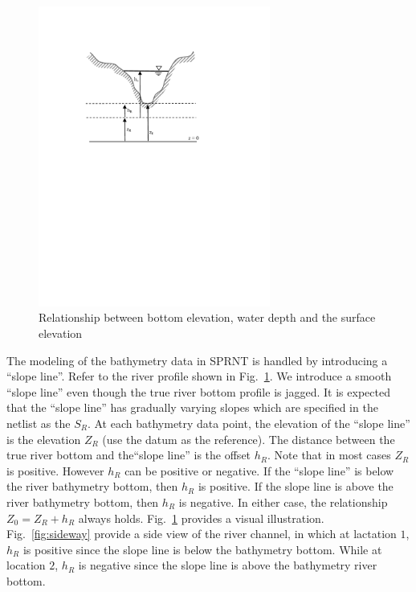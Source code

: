 \documentclass[10pt, letterpaper]{article}
\def\epswidth{3.0in}
\begin{document}
\begin{figure}[hbt]
\centerline{
\includegraphics[width=\epswidth, keepaspectratio=true]{Figs/cross_carton.pdf}  
}
\caption{Relationship between bottom elevation, water depth and the surface elevation}
\label{fig:elevation}
\end{figure}

The modeling of the bathymetry data in SPRNT is handled by introducing a ``slope
line''. Refer to the river profile shown in Fig.~\ref{fig:elevation}. We introduce a
smooth ``slope line'' even though the true river bottom profile is jagged. It is expected
that the ``slope line'' has gradually varying slopes which are specified in the netlist as the
$S_R$. At each bathymetry data point, the elevation of the ``slope line'' is the elevation
$Z_R$ (use the datum as the reference). The distance between the true river bottom and
the``slope line'' is the offset $h_R$. Note that in most cases $Z_R$ is positive. However
$h_R$ can be positive or negative. If the ``slope line'' is below the river bathymetry
bottom, then $h_R$ is positive. If the slope line is above the river bathymetry bottom,
then $h_R$ is negative. In either case, the relationship $Z_0 = Z_R + h_R$ always holds.
Fig.~\ref{fig:elevation} provides a visual illustration. Fig.~\ref{fig:sideway} provide a
side view of the river channel, in which at lactation $1$, $h_R$ is positive since the
slope line is below the bathymetry bottom. While at location $2$, $h_R$ is negative since
the slope line is above the bathymetry river bottom.
\end{document}

